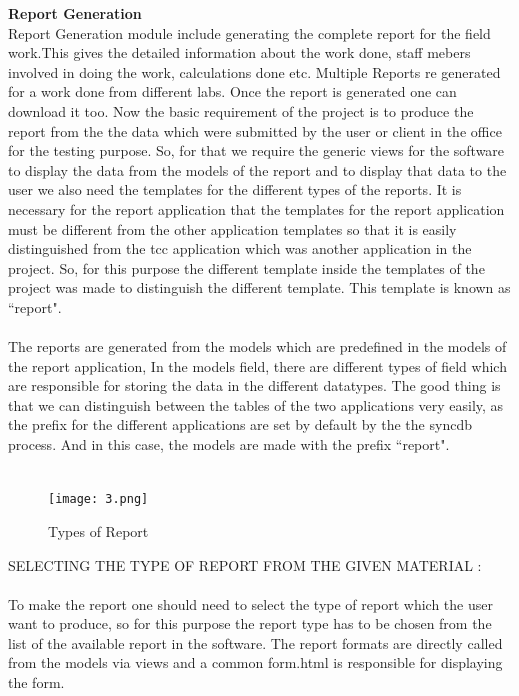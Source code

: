\newpage
{\bf Report Generation}\\

Report Generation module include generating the complete report for the field work.This gives the detailed information about the work done, staff mebers involved in doing the work, calculations done etc. Multiple Reports re generated for a work done from different labs. Once the report is generated one can download it too. Now the basic requirement of the project  is to produce the report from the the data which were submitted by the user or client in the office for the testing purpose. So, for that we require the generic views for the software to display the data from the models of the report and to display that data to the user we also need the templates for the different types of the reports. It is necessary for the report application that the templates for the report application must be different from the other application templates so that it is easily distinguished from the tcc application which was another application in the project. So, for this purpose the different template inside the templates of the project was made to distinguish the different template. This template is known as ``report".\\\\
The reports are generated from the models which are predefined in the models of the report application, In the  models field, there are different types of field which are responsible for storing the data in the different datatypes. The good thing is that we can distinguish between the tables of the two applications very easily, as the prefix for the different applications are set by default by the the syncdb process. And in this case, the models are made with the prefix ``report".\\\\
\begin{figure}[h]
\centering \texttt{[image: 3.png]}
\caption{Types of Report}
\end{figure}
SELECTING THE TYPE OF REPORT FROM THE GIVEN MATERIAL :\\\\
To make the report one should need to select the type of report which the user want to produce, so for this purpose the report type has to be chosen from the list of the available report in the software. The report formats are directly called from the models via views and a common form.html is responsible for displaying the form.\\\\
